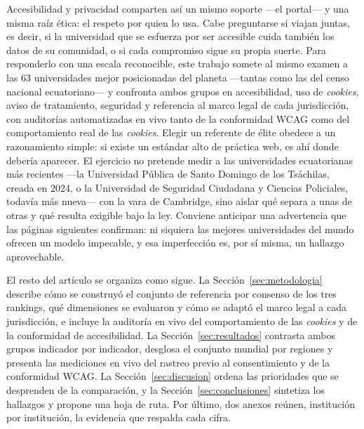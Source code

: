 \documentclass[pdflatex,sn-basic,Numbered]{sn-jnl}
\theoremstyle{thmstyleone}
\theoremstyle{thmstyletwo}
\theoremstyle{thmstylethree}
\begin{document}
Accesibilidad y privacidad comparten así un mismo soporte ---el portal--- y una misma raíz ética: el respeto por quien lo usa. Cabe preguntarse si viajan juntas, es decir, si la universidad que se esfuerza por ser accesible cuida también los datos de su comunidad, o si cada compromiso sigue su propia suerte. Para responderlo con una escala reconocible, este trabajo somete al mismo examen a las 63 universidades mejor posicionadas del planeta ---tantas como las del censo nacional ecuatoriano--- y confronta ambos grupos en accesibilidad, uso de \emph{cookies}, aviso de tratamiento, seguridad y referencia al marco legal de cada jurisdicción, con auditorías automatizadas en vivo tanto de la conformidad WCAG como del comportamiento real de las \emph{cookies}. Elegir un referente de élite obedece a un razonamiento simple: si existe un estándar alto de práctica web, es ahí donde debería aparecer. El ejercicio no pretende medir a las universidades ecuatorianas más recientes ---la Universidad Pública de Santo Domingo de los Tsáchilas, creada en 2024, o la Universidad de Seguridad Ciudadana y Ciencias Policiales, todavía más nueva--- con la vara de Cambridge, sino aislar qué separa a unas de otras y qué resulta exigible bajo la ley. Conviene anticipar una advertencia que las páginas siguientes confirman: ni siquiera las mejores universidades del mundo ofrecen un modelo impecable, y esa imperfección es, por sí misma, un hallazgo aprovechable.

El resto del artículo se organiza como sigue. La Sección~\ref{sec:metodologia} describe cómo se construyó el conjunto de referencia por consenso de los tres rankings, qué dimensiones se evaluaron y cómo se adaptó el marco legal a cada jurisdicción, e incluye la auditoría en vivo del comportamiento de las \emph{cookies} y de la conformidad de accesibilidad. La Sección~\ref{sec:resultados} contrasta ambos grupos indicador por indicador, desglosa el conjunto mundial por regiones y presenta las mediciones en vivo del rastreo previo al consentimiento y de la conformidad WCAG. La Sección~\ref{sec:discusion} ordena las prioridades que se desprenden de la comparación, y la Sección~\ref{sec:conclusiones} sintetiza los hallazgos y propone una hoja de ruta. Por último, dos anexos reúnen, institución por institución, la evidencia que respalda cada cifra.
\end{document}
